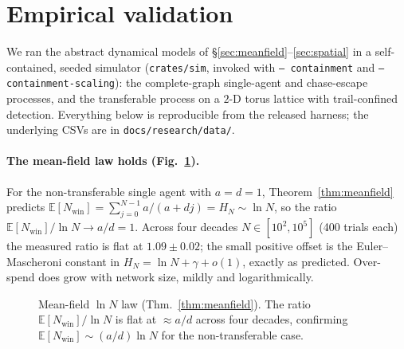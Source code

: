 \documentclass[11pt]{article}
\theoremstyle{plain}
\theoremstyle{definition}
\newcommand{\Nwin}{N_{\mathrm{win}}}
\newcommand{\E}{\mathbb{E}}
\begin{document}
\section{Empirical validation}\label{sec:empirical}

We ran the abstract dynamical models of \S\ref{sec:meanfield}--\ref{sec:spatial}
in a self-contained, seeded simulator (\texttt{crates/sim}, invoked with
\texttt{-- containment} and \texttt{-- containment-scaling}): the complete-graph
single-agent and chase-escape processes, and the transferable process on a $2$-D
torus lattice with trail-confined detection. Everything below is reproducible from
the released harness; the underlying CSVs are in \texttt{docs/research/data/}.

\paragraph{The mean-field law holds (Fig.~\ref{fig:lnn}).}
For the non-transferable single agent with $a=d=1$, Theorem~\ref{thm:meanfield}
predicts $\E[\Nwin]=\sum_{j=0}^{N-1} a/(a+dj)=H_N\sim\ln N$, so the ratio
$\E[\Nwin]/\ln N\to a/d=1$. Across four decades $N\in[10^2,10^5]$ (400 trials
each) the measured ratio is flat at $1.09\pm0.02$; the small positive offset is the
Euler--Mascheroni constant in $H_N=\ln N+\gamma+o(1)$, exactly as predicted.
Over-spend does grow with network size, mildly and logarithmically.

\begin{figure}[t]\centering
{}
\caption{Mean-field $\ln N$ law (Thm.~\ref{thm:meanfield}). The ratio
$\E[\Nwin]/\ln N$ is flat at $\approx a/d$ across four decades, confirming
$\E[\Nwin]\sim(a/d)\ln N$ for the non-transferable case.}\label{fig:lnn}
\end{figure}
\end{document}
